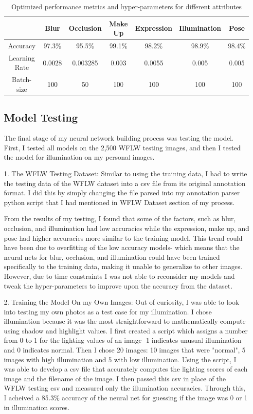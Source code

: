 \documentclass{article}
\begin{document}
\begin{table}[h]
    \centering
    \begin{tabular}{|c|c|c|c|c|c|c|}
        \hline
        & Blur & Occlusion & Make Up & Expression & Illumination & Pose \\ \hline
        Accuracy & 97.3\% & 95.5\% & 99.1\% & 98.2\% & 98.9\% & 98.4\% \\ \hline
        Learning Rate & 0.0028 & 0.003285 & 0.003 & 0.0055 & 0.005 & 0.005 \\ \hline
        Batch-size & 100 & 50 & 100 & 100 & 100 & 100 \\ \hline
    \end{tabular}
    \caption{Optimized performance metrics and hyper-parameters for different attributes}
    \label{tab:placeholder}
\end{table}


\subsection{Model Testing}
The final stage of my neural network building process was testing the model. First, I tested all models on the 2,500 WFLW testing images, and then I tested the model for illumination on my personal images.

1. The WFLW Testing Dataset: Similar to using the training data, I had to write the testing data of the WFLW dataset into a csv file from its original annotation format. I did this by simply changing the file parsed into my annotation parser python script that I had mentioned in WFLW Dataset section of my process. 

From the results of my testing, I found that some of the factors, such as blur, occlusion, and illumination had low accuracies while the expression, make up, and pose had higher accuracies more similar to the training model. This trend could have been due to overfitting of the low accuracy models- which means that the neural nets for blur, occlusion, and illumination could have been trained specifically to the training data, making it unable to generalize to other images. However, due to time constraints I was not able to reconsider my models and tweak the hyper-parameters to improve upon the accuracy from the dataset.


2. Training the Model On my Own Images: Out of curiosity, I was able to look into testing my own photos as a test case for my illumination. I chose illumination because it was the most straightforward to mathematically compute using shadow and highlight values. I first created a script which assigns a number from 0 to 1 for the lighting values of an image- 1 indicates unusual illumination and 0 indicates normal. Then I chose 20 images: 10 images that were "normal", 5 images with high illumination and 5 with low illumination. Using the script, I was able to develop a csv file that accurately computes the lighting scores of each image and the filename of the image. I then passed this csv in place of the WFLW testing csv and measured only the illumination accuracies. Through this, I acheived a 85.3\% accuracy of the neural net for guessing if the image was 0 or 1 in illumination scores. 
\end{document}
